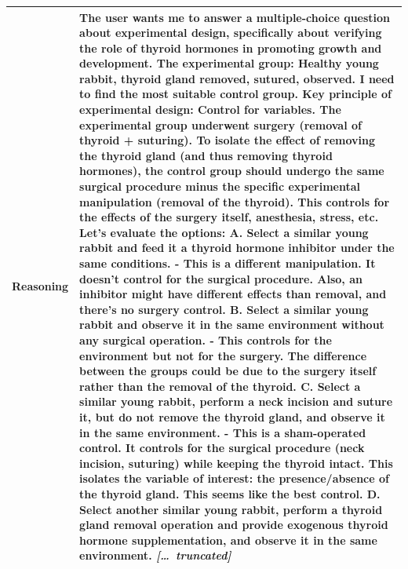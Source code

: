 \begin{longtable}{@{}l p{13cm}@{}}
  \textbf{Reasoning} & The user wants me to answer a multiple-choice question about experimental design, specifically about verifying the role of thyroid hormones in promoting growth and development. \newline The experimental group: Healthy young rabbit, thyroid gland removed, sutured, observed. \newline I need to find the most suitable control group. \newline Key principle of experimental design: Control for variables. The experimental group underwent surgery (removal of thyroid + suturing). To isolate the effect of removing the thyroid gland (and thus removing thyroid hormones), the control group should undergo the same surgical procedure minus the specific experimental manipulation (removal of the thyroid). This controls for the effects of the surgery itself, anesthesia, stress, etc. \newline Let's evaluate the options: \newline A. Select a similar young rabbit and feed it a thyroid hormone inhibitor under the same conditions. \newline - This is a different manipulation. It doesn't control for the surgical procedure. Also, an inhibitor might have different effects than removal, and there's no surgery control. \newline B. Select a similar young rabbit and observe it in the same environment without any surgical operation. \newline - This controls for the environment but not for the surgery. The difference between the groups could be due to the surgery itself rather than the removal of the thyroid. \newline C. Select a similar young rabbit, perform a neck incision and suture it, but do not remove the thyroid gland, and observe it in the same environment. \newline - This is a sham-operated control. It controls for the surgical procedure (neck incision, suturing) while keeping the thyroid intact. This isolates the variable of interest: the presence/absence of the thyroid gland. This seems like the best control. \newline D. Select another similar young rabbit, perform a thyroid gland removal operation and provide exogenous thyroid hormone supplementation, and observe it in the same environment. \newline \textit{[\ldots\ truncated]}  \\
  \midrule

\end{longtable}
